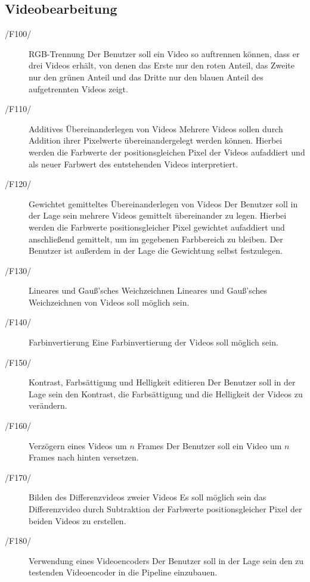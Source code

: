 \subsection{Videobearbeitung}
\begin{description}
        \item[/F100/]RGB-Trennung \newline
                 Der Benutzer soll ein Video so auftrennen können, dass er drei Videos erhält, von denen das Erste nur den roten Anteil, das Zweite nur den grünen Anteil und das Dritte nur den blauen Anteil des aufgetrennten Videos zeigt.
        \item[/F110/]Additives Übereinanderlegen von Videos \newline
                Mehrere Videos sollen durch Addition ihrer Pixelwerte übereinandergelegt werden können. Hierbei werden die Farbwerte der positionsgleichen Pixel der Videos aufaddiert und als neuer Farbwert des entstehenden Videos interpretiert.
        \item[/F120/]Gewichtet gemitteltes Übereinanderlegen von  Videos \newline
                Der Benutzer soll in der Lage sein mehrere Videos gemittelt übereinander zu legen. Hierbei werden die Farbwerte positionsgleicher Pixel gewichtet aufaddiert und anschließend gemittelt, um im gegebenen Farbbereich zu bleiben. Der Benutzer ist außerdem in der Lage die Gewichtung selbst festzulegen.
        \item[/F130/]Lineares und Gauß'sches Weichzeichnen \newline
                Lineares und Gauß'sches Weichzeichnen von Videos soll möglich sein.
        \item[/F140/]Farbinvertierung \newline
                Eine Farbinvertierung der Videos soll möglich sein.
        \item[/F150/]Kontrast, Farbsättigung und Helligkeit editieren \newline
                Der Benutzer soll in der Lage sein den Kontrast, die Farbsättigung und die Helligkeit der Videos zu verändern.
        \item[/F160/]Verzögern eines Videos um $n$ Frames \newline
                Der Benutzer soll ein Video um $n$ Frames nach hinten versetzen.       
        \item[/F170/]Bilden des Differenzvideos zweier Videos \newline
                Es soll möglich sein das Differenzvideo durch Subtraktion der Farbwerte positionsgleicher Pixel der beiden Videos zu erstellen.
	\item[/F180/]Verwendung eines Videoencoders \newline
		Der Benutzer soll in der Lage sein den zu testenden Videoencoder in die Pipeline einzubauen.
\end{description}
 

